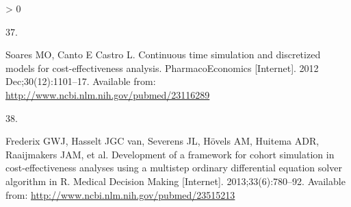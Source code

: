 \documentclass[
]{article}
\newlength{\cslhangindent}
\newlength{\csllabelwidth}
\newenvironment{CSLReferences}[2] %
 {%
  \setlength{\parindent}{0pt}
  \ifodd #1 \everypar{\setlength{\hangindent}{\cslhangindent}}\ignorespaces\fi
  \ifnum #2 > 0
  \setlength{\parskip}{#2\baselineskip}
  \fi
 }%
 {}
\newcommand{\CSLLeftMargin}[1]{\parbox[t]{\csllabelwidth}{#1}}
\newcommand{\CSLRightInline}[1]{\parbox[t]{\linewidth - \csllabelwidth}{#1}\break}
\begin{document}
\begin{CSLReferences}{0}{0}
\leavevmode\hypertarget{ref-Soares2012}{}%
\CSLLeftMargin{37. }
\CSLRightInline{Soares MO, Canto E Castro L. {Continuous time simulation and discretized models for cost-effectiveness analysis}. PharmacoEconomics {[}Internet{]}. 2012 Dec;30(12):1101--17. Available from: \url{http://www.ncbi.nlm.nih.gov/pubmed/23116289}}

\leavevmode\hypertarget{ref-Frederix2013a}{}%
\CSLLeftMargin{38. }
\CSLRightInline{Frederix GWJ, Hasselt JGC van, Severens JL, Hövels AM, Huitema ADR, Raaijmakers JAM, et al. {Development of a framework for cohort simulation in cost-effectiveness analyses using a multistep ordinary differential equation solver algorithm in R.} Medical Decision Making {[}Internet{]}. 2013;33(6):780--92. Available from: \url{http://www.ncbi.nlm.nih.gov/pubmed/23515213}}

\end{CSLReferences}
\end{document}
